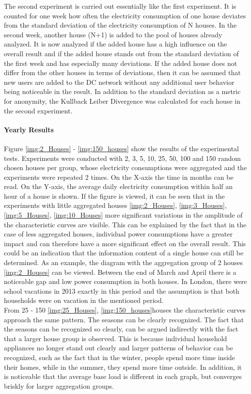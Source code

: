 The second experiment is carried out essentially like the first experiment. It is counted for one week how often the electricity consumption of one house deviates from the standard deviation of the electricity consumption of N houses. In the second week, another house (N+1) is added to the pool of houses already analyzed. It is now analyzed if the added house has a high influence on the overall result and if the added house stands out from the standard deviation of the first week and has especially many deviations. If the added house does not differ from the other houses in terms of deviations, then it can be assumed that new users are added to the DC network without any additional user behavior being noticeable in the result. In addition to the standard deviation as a metric for anonymity, the Kullback Leiber Divergence was calculated for each house in the second experiment. 
\\
\\
\textbf{Yearly Results}
\\
\\
Figure \ref{img:2_Houses} - \ref{img:150_houses} show the results of the experimental tests. Experiments were conducted with 2, 3, 5, 10, 25, 50, 100 and 150 random chosen houses per group, whose electricity consumptions were aggregated and the experiments were repeated 2 times. On the X-axis the time in months can be read. On the Y-axis, the average daily electricity consumption within half an hour of a house is shown. If the figure is viewed, it can be seen that in the experiments with little aggregated houses \ref{img:2_Houses}, \ref{img:3_Houses}, \ref{img:5_Houses}, \ref{img:10_Houses} more significant variations in the amplitude of the characteristic curves are visible. This can be explained by the fact that in the case of less aggregated houses, individual power consumptions have a greater impact and can therefore have a more significant effect on the overall result. This could be an indication that the information content of a single house can still be determined. As an example, the diagram  with the aggregation group of 2 houses \ref{img:2_Houses} can be viewed. Between the end of March and April there is a noticeable gap and low power consumption in both houses. In London, there were school vacations in 2013 exactly in this period and the assumption is that both households were on vacation in the mentioned period.\\
From 25 - 150 \ref{img:25_Houses}, \ref{img:150_houses}houses the characteristic curves approach the same pattern. The seasons can be clearly recognized. The fact that the seasons can be recognized so clearly, can be argued indirectly with the fact that a larger house group is observed. This is because individual household appliances no longer stand out clearly and larger patterns of behavior can be recognized, such as the fact that in the winter, people spend more time inside their homes, while in the summer, they spend more time outside. In addition, it is noticeable that the average base load is different in each graph, but converges briskly for larger aggregation groups. \\
